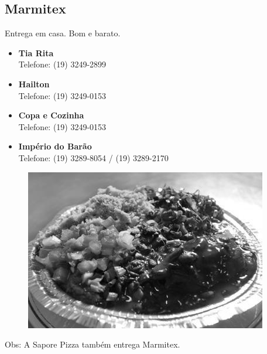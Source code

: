 \subsection{Marmitex}

Entrega em casa. Bom e barato.

\begin{itemize}
\item   \textbf{Tia Rita}
        \\Telefone: (19) 3249-2899

\item   \textbf{Hailton}
        \\Telefone: (19) 3249-0153

\item   \textbf{Copa e Cozinha}
        \\Telefone: (19) 3249-0153

\item   \textbf{Império do Barão}
        \\Telefone: (19) 3289-8054 / (19) 3289-2170
\end{itemize}

\begin{figure}[t!]
    \centering
    \includegraphics[scale=0.55,keepaspectratio=true]{img/imgs/6-comida/marmitex.jpg}
\end{figure}

Obs: A Sapore Pizza também entrega Marmitex.

